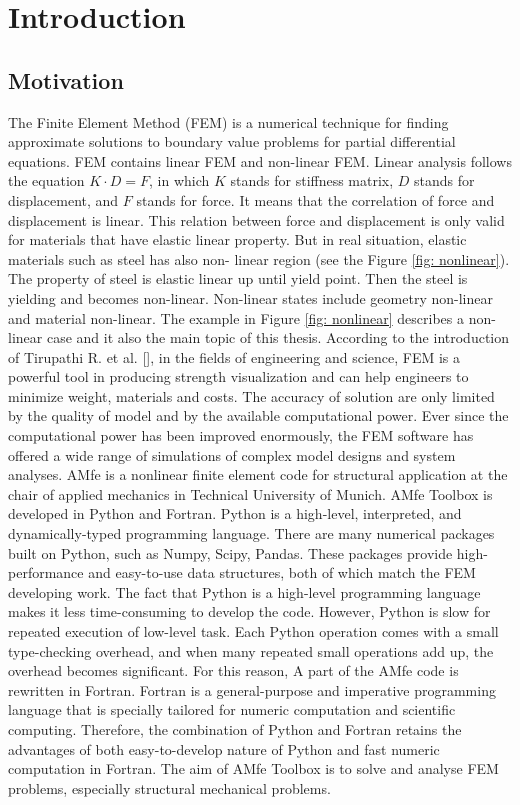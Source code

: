 \chapter{Introduction}



\section{Motivation} \label{sec:Einl:Motivation}
The Finite Element Method (FEM) is a numerical technique for finding approximate solutions to boundary value problems for partial differential equations. FEM contains linear FEM and non-linear FEM. 
Linear analysis follows the equation $K\cdot D = F$, in which $K$ stands for stiffness matrix, $D$ stands for  displacement, and $F$ stands for force. It means that the correlation of force and displacement is linear. This relation between force and displacement is only valid for materials that have elastic linear property. But in real situation, elastic materials such as steel has also non- linear region (see the Figure \ref{fig: nonlinear}). The property of steel is elastic linear up until yield point. Then the steel is yielding and becomes non-linear. Non-linear states include geometry non-linear and material non-linear. The example in Figure \ref{fig: nonlinear} describes a non-linear case and it also the main topic of this thesis. According to the introduction of Tirupathi R. et al. [\cite{FEintro}], in the fields of engineering and science, FEM is a powerful tool in producing strength visualization and can help engineers to minimize weight, materials and costs. The accuracy of solution are only limited by the quality of model and by the available computational power.  Ever since the computational power has been improved enormously, the FEM software has offered a wide range of simulations of complex model designs and system analyses.  \newline
AMfe is a nonlinear finite element code for structural application at the chair of applied mechanics in Technical University of Munich. AMfe Toolbox is developed in Python and Fortran. Python is a high-level, interpreted, and dynamically-typed programming language.  There are many numerical packages built on Python, such as Numpy, Scipy, Pandas. These packages provide high-performance and easy-to-use data structures, both of which match the FEM developing work. The fact that Python is a high-level programming language makes it less time-consuming to develop the code. However, Python is slow for repeated execution of low-level task. Each Python operation comes with a small type-checking overhead, and when many repeated small operations add up, the overhead becomes significant. For this reason, A part of the AMfe code is rewritten in Fortran. Fortran is a general-purpose and imperative programming language that is specially tailored for numeric computation and scientific computing. Therefore, the combination of Python and Fortran retains the advantages of both easy-to-develop nature of Python and fast numeric computation in Fortran. The aim of AMfe Toolbox is to solve and analyse FEM problems, especially structural mechanical problems.

